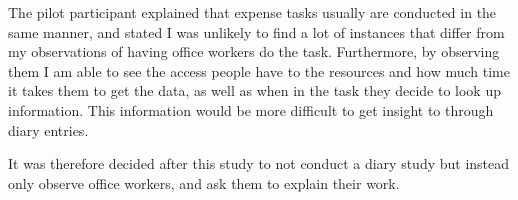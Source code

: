 The pilot participant explained that expense tasks usually are conducted in the same manner, and stated I was unlikely to find a lot of instances that differ from my observations of having office workers do the task.
Furthermore, by observing them I am able to see the access people have to the resources and how much time it takes them to get the data, as well as when in the task they decide to look up information. This information would be more difficult to get insight to through diary entries.

It was therefore decided after this study to not conduct a diary study but instead only observe office workers, and ask them to explain their work.

